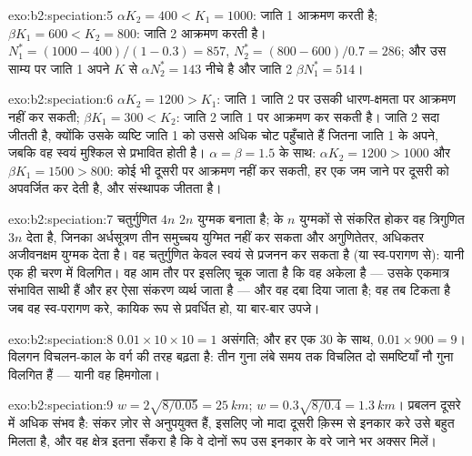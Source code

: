 \begin{solution}{exo:b2:speciation:5}
$\alpha K_2 = 400 < K_1 = 1000$: जाति 1 आक्रमण करती है; $\beta K_1 = 600
< K_2 = 800$: जाति 2 आक्रमण करती है। $N_1^{*} = (1000 - 400)/(1 - 0.3) =
857$, $N_2^{*} = (800 - 600)/0.7 = 286$; और उस साम्य पर जाति
1 अपने $K$ से $\alpha N_2^{*} = 143$ नीचे है और जाति 2 $\beta
N_1^{*} = 514$।
\end{solution}

\begin{solution}{exo:b2:speciation:6}
$\alpha K_2 = 1200 > K_1$: जाति 1 जाति 2 पर उसकी
धारण-क्षमता पर आक्रमण नहीं कर सकती; $\beta K_1 = 300 < K_2$: जाति 2
जाति 1 पर आक्रमण कर सकती है। जाति 2 सदा जीतती है, क्योंकि उसके व्यष्टि
जाति 1 को उससे अधिक चोट पहुँचाते हैं जितना जाति 1 के अपने, जबकि वह स्वयं मुश्किल से
प्रभावित होती है। $\alpha = \beta = 1.5$ के साथ: $\alpha K_2 = 1200 > 1000$
और $\beta K_1 = 1500 > 800$: कोई भी दूसरी पर आक्रमण नहीं कर सकती, हर एक
जम जाने पर दूसरी को अपवर्जित कर देती है, और संस्थापक जीतता है।
\end{solution}

\begin{solution}{exo:b2:speciation:7}
चतुर्गुणित $4n$ $2n$ युग्मक बनाता है;  के $n$
युग्मकों से संकरित होकर वह त्रिगुणित $3n$ देता है, जिनका अर्धसूत्रण तीन
समुच्चय युग्मित नहीं कर सकता और अगुणितेतर, अधिकतर अजीवनक्षम युग्मक देता है। वह
चतुर्गुणित केवल स्वयं से प्रजनन कर सकता है (या स्व-परागण से): यानी
एक ही चरण में विलगित। वह आम तौर पर इसलिए चूक जाता है कि वह अकेला है --- उसके एकमात्र
संभावित साथी  हैं और हर ऐसा संकरण व्यर्थ जाता है ---
और वह दबा दिया जाता है; वह तब टिकता है जब वह स्व-परागण करे, कायिक रूप से प्रवर्धित हो,
या बार-बार उपजे।
\end{solution}

\begin{solution}{exo:b2:speciation:8}
$0.01\times 10\times 10 = 1$ असंगति; और हर एक 30 के साथ, $0.01\times
900 = 9$। विलगन विचलन-काल के वर्ग की तरह बढ़ता है: तीन गुना
लंबे समय तक विचलित दो समष्टियाँ नौ गुना
विलगित हैं --- यानी वह हिमगोला।
\end{solution}

\begin{solution}{exo:b2:speciation:9}
$w = 2\sqrt{8/0.05} = \qty{25}{km}$; $w = 0.3\sqrt{8/0.4} =
\qty{1.3}{km}$। प्रबलन दूसरे में अधिक संभव है: संकर
ज़ोर से अनुपयुक्त हैं, इसलिए जो मादा दूसरी क़िस्म से इनकार करे उसे
बहुत मिलता है, और वह क्षेत्र इतना सँकरा है कि वे दोनों रूप उस इनकार के वरे जाने भर
अक्सर मिलें।
\end{solution}

